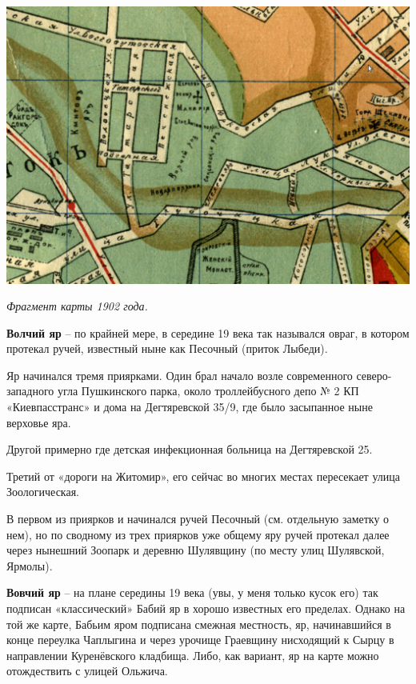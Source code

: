 \begin{center}
\includegraphics[width=\linewidth]{rpix/volch01.jpg}

\textit{Фрагмент карты 1902 года.}
\end{center}



\medskip

\textbf{Волчий яр} – по крайней мере, в середине 19 века так назывался овраг, в котором протекал ручей, известный ныне как Песочный (приток Лыбеди).

Яр начинался тремя приярками. Один брал начало возле современного северо-западного угла Пушкинского парка, около троллейбусного депо № 2 КП «Киевпасстранс» и дома на Дегтяревской 35/9, где было засыпанное ныне верховье яра.

Другой примерно где детская инфекционная больница на Дегтяревской 25. 

Третий от «дороги на Житомир», его сейчас во многих местах пересекает улица Зоологическая. 

В первом из приярков и начинался ручей Песочный (см. отдельную заметку о нем), но по сводному из трех приярков уже общему яру ручей протекал далее через нынешний Зоопарк и деревню Шулявщину (по месту улиц Шулявской, Ярмолы).\\

\medskip

\textbf{Вовчий яр} – на плане середины 19 века (увы, у меня только кусок его) так подписан «классический» Бабий яр в хорошо известных его пределах. Однако на той же карте, Бабьим яром подписана смежная местность, яр, начинавшийся в конце переулка Чаплыгина и через урочище Граевщину нисходящий к Сырцу в направлении Куренёвского кладбища. Либо, как вариант, яр на карте можно отождествить с улицей Ольжича.\\

